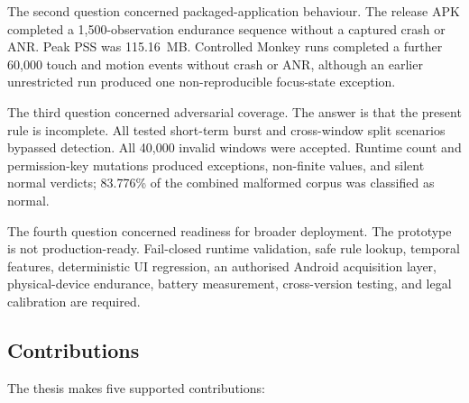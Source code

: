 The second question concerned packaged-application behaviour. The release APK completed a 1,500-observation endurance sequence without a captured crash or ANR. Peak PSS was 115.16~MB. Controlled Monkey runs completed a further 60,000 touch and motion events without crash or ANR, although an earlier unrestricted run produced one non-reproducible focus-state exception.

The third question concerned adversarial coverage. The answer is that the present rule is incomplete. All tested short-term burst and cross-window split scenarios bypassed detection. All 40,000 invalid windows were accepted. Runtime count and permission-key mutations produced exceptions, non-finite values, and silent normal verdicts; 83.776\% of the combined malformed corpus was classified as normal.

The fourth question concerned readiness for broader deployment. The prototype is not production-ready. Fail-closed runtime validation, safe rule lookup, temporal features, deterministic UI regression, an authorised Android acquisition layer, physical-device endurance, battery measurement, cross-version testing, and legal calibration are required.

\subsection{Contributions}

The thesis makes five supported contributions:

